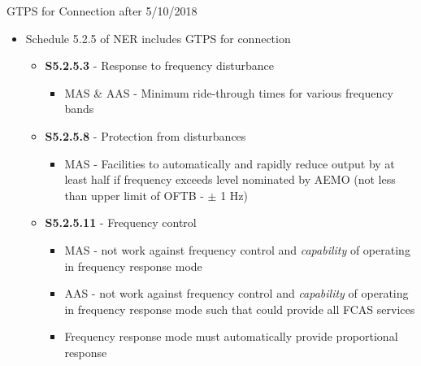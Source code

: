 \begin{frame}{GTPS for Connection after 5/10/2018}
\begin{itemize}
\item Schedule 5.2.5 of NER includes GTPS for connection
    \begin{itemize}
    \item \textbf{S5.2.5.3} - Response to frequency disturbance
    \begin{itemize}
        \item MAS & AAS - Minimum ride-through times for various frequency bands
    \end{itemize}
    \item \textbf{S5.2.5.8} - Protection from disturbances
    \begin{itemize}
        \item MAS - Facilities to automatically and rapidly reduce output by at least half if frequency exceeds level nominated by AEMO (not less than upper limit of OFTB - $\pm$ 1 Hz)
    \end{itemize}
    \item \textbf{S5.2.5.11} - Frequency control
    \begin{itemize}
        \item MAS - not work against frequency control and \textit{capability} of operating in frequency response mode
        \item AAS - not work against frequency control and \textit{capability} of operating in frequency response mode such that could provide all FCAS services
        \item Frequency response mode must automatically provide proportional response
    \end{itemize}
    \end{itemize}
\end{itemize}
\end{frame}